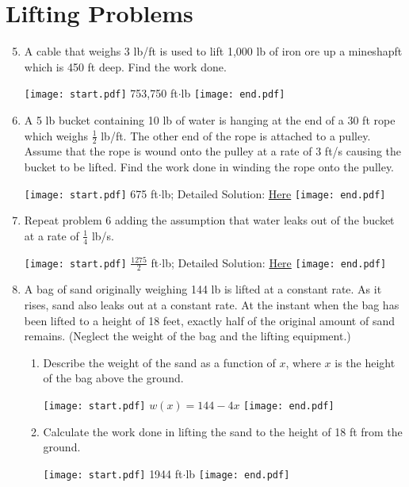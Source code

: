 \documentclass[12pt]{article}
\begin{document}
\section*{Lifting Problems}

\begin{enumerate}
\setcounter{enumi}{4}
\item A cable that weighs 3 lb/ft is used to lift 1,000 lb of iron ore up a mineshapft which is 450 ft deep.  Find the work done.

\texttt{[image: start.pdf]}
{{753,750 ft$\cdot$lb}}
\texttt{[image: end.pdf]}


\item A 5 lb bucket containing 10 lb of water is hanging at the end of a 30 ft rope which weighs $\frac{1}{2}$ lb/ft.  The other end of the rope is attached to a pulley.  Assume that the rope is wound onto the pulley at a rate of 3 ft/s causing the bucket to be lifted. Find the work done in winding the rope onto the pulley.

\texttt{[image: start.pdf]}
{{675 ft$\cdot$lb; Detailed Solution: \textcolor{blue}{\href{http://www.math.drexel.edu/classes/Calculus/resources/Math122HW/Solutions/122_10_Work_06_07.pdf}{Here}}}}
\texttt{[image: end.pdf]}


\item Repeat problem 6 adding the assumption that water leaks out of the bucket at a rate of $\frac{1}{4}$ lb/s.

\texttt{[image: start.pdf]}
{{$\frac{1275}{2}$ ft$\cdot$lb; Detailed Solution: \textcolor{blue}{\href{http://www.math.drexel.edu/classes/Calculus/resources/Math122HW/Solutions/122_10_Work_06_07.pdf}{Here}}}}
\texttt{[image: end.pdf]}


\item A bag of sand originally weighing 144 lb is lifted at a constant rate.  As it rises, sand also leaks out at a constant rate.  At the instant when the bag has been lifted to a height of 18 feet, exactly half of the original amount of sand remains.  (Neglect the weight of the bag and the lifting equipment.)

\begin{enumerate}

\item Describe the weight of the sand as a function of $x$, where $x$ is the height of the bag above the ground.

\texttt{[image: start.pdf]}
{{$w(x)=144-4x$}}
\texttt{[image: end.pdf]}


\item Calculate the work done in lifting the sand to the height of 18 ft from the ground.

\texttt{[image: start.pdf]}
{{1944 ft$\cdot$lb}}
\texttt{[image: end.pdf]}


\end{enumerate}

\end{enumerate}
\end{document}

